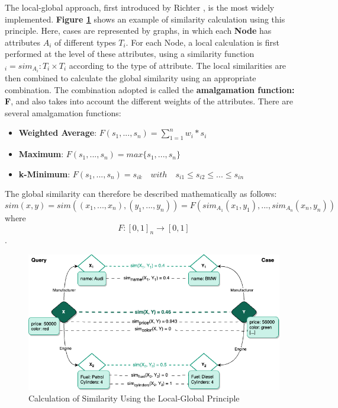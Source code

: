     The local-global approach, first introduced by Richter \cite{richter2008similarity, richter2013basic}, is the most widely implemented. \textbf{Figure \ref{fig:cbr-exam}} shows an example of similarity calculation using this principle. Here, cases are represented by graphs, in which each \textbf{Node} has attributes $A_i$ of different types $T_i$. For each Node, a local calculation is first performed at the level of these attributes, using a similarity function $_i = sim_{A_i} : T_i \times T_i$ according to the type of attribute. The local similarities are then combined to calculate the global similarity using an appropriate combination. The combination adopted is called the \textbf{amalgamation function: F}, and also takes into account the different weights of the attributes. There are several amalgamation functions:
    
    \begin{itemize}
        \item \textbf{Weighted Average}: $F(s_1,...,s_n)= \sum_{1=1}^{n} w_i*s_i$
        \item \textbf{Maximum}: $F(s_1,...,s_n) = max\{s_1,...,s_n\}$
        \item \textbf{k-Minimum}: $F(s_1,...,s_n) = s_{ik} \quad with \quad s_{i1} \leq s_{i2} \leq ... \leq s_{in}$
    \end{itemize}
    
    The global similarity can therefore be described mathematically as follows:\\
    \[sim(x,y) = sim((x_1,...,x_n),(y_1,...,y_n)) = F(sim_{A_1}(x_1, y_1),..., sim_{A_n}(x_n, y_n) )\] where \[F: [0,1]_n \rightarrow [0,1]\].\\


    \begin{figure}[h]
    \centering
    \includegraphics[scale=0.6]{images/Concept-CBR Exemple.drawio.png}
    \caption{\label{fig:cbr-exam}  Calculation of Similarity Using the Local-Global Principle}
    \end{figure}
    
